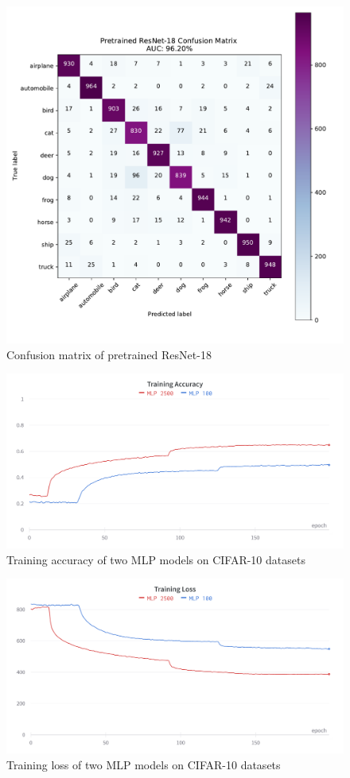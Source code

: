 \documentclass[twocolumn, draft]{extarticle}
\begin{document}
\begin{appendices}
\begin{figure}[H]
\centering
\includegraphics[width=0.9\linewidth]{"charts/resnet-cifar-conf"}
\caption{Confusion matrix of pretrained ResNet-18}
\label{fig:resnet-cifar-conf}
\end{figure}

\begin{figure}[H]
\centering
\includegraphics[width=0.9\linewidth]{charts/mlp_cifar_10_train_acc}
\caption{Training accuracy of two MLP models on CIFAR-10 datasets}
\label{chart: mlp_1}
\end{figure}

\begin{figure}[H]
\centering
\includegraphics[width=0.9\linewidth]{charts/mlp_cifar_10_train_loss}
\caption{Training loss of two MLP models on CIFAR-10 datasets}
\label{chart: mlp_2}
\end{figure}


\end{appendices}
\end{document}
